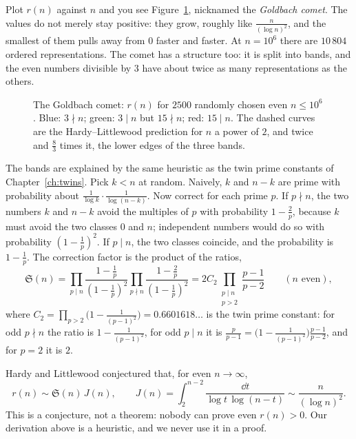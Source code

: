 Plot $r(n)$ against $n$ and you see Figure~\ref{fig:comet}, nicknamed the \emph{Goldbach comet}. The values do not merely stay positive: they grow, roughly
like $\frac n{(\log n)^2}$, and the smallest of them pulls away from $0$ faster and faster. At $n=10^6$ there are $10\,804$ ordered representations.
The comet has a structure too: it is split into bands, and the even numbers divisible by $3$ have about twice as many representations as the others.

\begin{figure}[ht]
\centering
{}
\caption{The Goldbach comet: $r(n)$ for $2500$ randomly chosen even $n\le10^6$. Blue: $3\nmid n$; green: $3\mid n$ but $15\nmid n$; red: $15\mid n$. The
dashed curves are the Hardy--Littlewood prediction for $n$ a power of $2$, and twice and $\frac83$ times it, the lower edges of the three bands.}
\label{fig:comet}
\end{figure}

The bands are explained by the same heuristic as the twin prime constants of Chapter~\ref{ch:twins}. Pick $k<n$ at random. Naively, $k$ and $n-k$ are
prime with probability about $\frac1{\log k}\cdot\frac1{\log(n-k)}$. Now correct for each prime $p$. If $p\nmid n$, the two numbers $k$ and $n-k$ avoid
the multiples of $p$ with probability $1-\frac2p$, because $k$ must avoid the two classes $0$ and $n$; independent numbers would do so with probability
$(1-\frac1p)^2$. If $p\mid n$, the two classes coincide, and the probability is $1-\frac1p$. The correction factor is the product of the ratios,
\[
\mathfrak S(n)=\prod_{p\mid n}\frac{1-\frac1p}{(1-\frac1p)^2}\prod_{p\nmid n}\frac{1-\frac2p}{(1-\frac1p)^2}=2C_2\prod_{\substack{p\mid n\\p>2}}\frac{p-1}{p-2}\qquad(n\text{ even}),
\]
where $C_2=\prod_{p>2}\bigl(1-\frac1{(p-1)^2}\bigr)=0.6601618\ldots$ is the twin prime constant: for odd $p\nmid n$ the ratio is $1-\frac1{(p-1)^2}$, for odd
$p\mid n$ it is $\frac p{p-1}=\bigl(1-\frac1{(p-1)^2}\bigr)\frac{p-1}{p-2}$, and for $p=2$ it is $2$.

\begin{remark}\label{rem:hlgoldbach}
Hardy and Littlewood conjectured that, for even $n\to\infty$,
\[
r(n)\sim\mathfrak S(n)\,J(n),\qquad J(n)=\int_2^{n-2}\frac{\dd t}{\log t\,\log(n-t)}\sim\frac n{(\log n)^2}.
\]
This is a conjecture, not a theorem: nobody can prove even $r(n)>0$. Our derivation above is a heuristic, and we never use it in a proof.
\end{remark}

